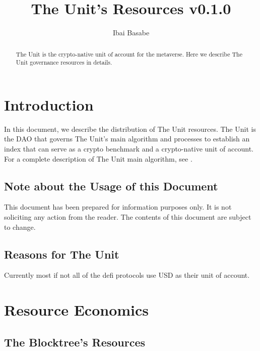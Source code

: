 \documentclass[12pt]{article}
\title{The Unit's Resources v0.1.0}
\author{Ibai Basabe}
\date{}           %
\begin{document}
\pagecolor{white}

\maketitle

\begin{abstract}

The Unit is the crypto-native unit of account for the metaverse. Here we describe The Unit governance resources in details.

\end{abstract}

\tableofcontents
\newpage



\section{Introduction}

In this document, we describe the distribution of The Unit resources. The Unit is the DAO that governs The Unit's main algorithm and processes to establish an index that can serve as a crypto benchmark and a crypto-native unit of account. For a complete description of The Unit main algorithm, see \cite{B1}.

\subsection{Note about the Usage of this Document}

This document has been prepared for information purposes only. It is not soliciting any action from the reader. The contents of this document are subject to change.




\subsection{Reasons for The Unit}

Currently most if not all of the defi protocols use USD as their unit of account.


\section{Resource Economics}

\subsection{The Blocktree's Resources}
\end{document}
